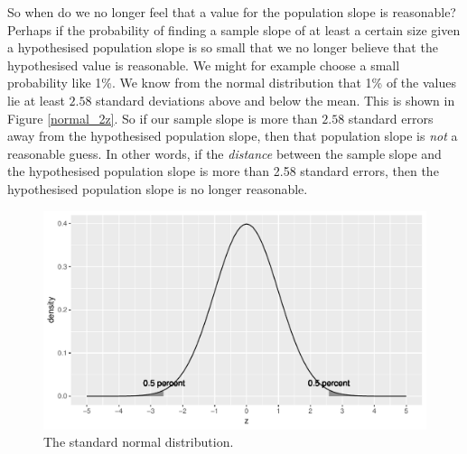 \documentclass[]{book}\usepackage[]{graphicx}\usepackage[]{color}
\makeatletter
\def\maxwidth{ %
  \ifdim\Gin@nat@width>\linewidth
    \linewidth
  \else
    \Gin@nat@width
  \fi
}
\newenvironment{knitrout}{}{} %
\makeatother
\begin{document}
So when do we no longer feel that a value for the population slope is reasonable? Perhaps if the probability of finding a sample slope of at least a certain size given a hypothesised population slope is so small that we no longer believe that the hypothesised value is reasonable. We might for example choose a small probability like 1\%. We know from the normal distribution that 1\% of the values lie at least $2.58$ standard deviations above and below the mean. This is shown in Figure \ref{normal_2z}. So if our sample slope is more than $2.58$ standard errors away from the hypothesised population slope, then that population slope is \textit{not} a reasonable guess. In other words, if the \textit{distance} between the sample slope and the hypothesised population slope is more than 2.58 standard errors, then the hypothesised population slope is no longer reasonable.

\begin{knitrout}
\color{fgcolor}\begin{figure}

{\centering \includegraphics[width=\maxwidth]{figure/normal_2z-1} 

}

\caption[The standard normal distribution]{The standard normal distribution.}\label{fig:normal_2z}
\end{figure}


\end{knitrout}
\end{document}
